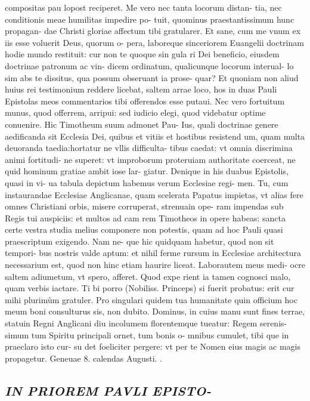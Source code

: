 \documentclass{article}
\begin{document}
\begin{pages}
compositas pau lopost reciperet. Me vero nec tanta locorum distan- tia, nec conditionis meae humilitas impedire po- tuit, quominus praestantissimum hunc propagan- dae Christi gloriae affectum tibi gratularer. Et sane, cum me vnum ex iis esse voluerit Deus, quorum o- pera, laboreque sinceriorem Euangelii doctrinam hodie mundo restituit: cur non te quoque sin gula ri Dei beneficio, eiusdem doctrinae patronum ac vin- dicem ordinatum, qualicunque locorum interual- lo sim abs te dissitus, qua possum obseruant ia prose- quar? Et quoniam non aliud huius rei testimonium reddere licebat, saltem arrae loco, hos in duas Pauli Epistolas meos commentarios tibi offerendos esse putaui. Nec vero fortuitum munus, quod offerrem, arripui: sed iudicio elegi, quod videbatur optime conuenire. Hic Timotheum suum admonet Pau- Ius, quali doctrinae genere aedificanda sit Ecclesia Dei, quibus et vitiis et hostibus resistend um, quam multa deuoranda taedia:hortatur ne vllis difficulta- tibus caedat: vt omnia discrimina animi fortitudi- ne superet: vt improborum proteruiam authoritate coerceat, ne quid hominum gratiae ambit iose lar- giatur. Denique in his duabus Epistolis, quasi in vi- ua tabula depictum habemus verum Ecclesiae regi-  \pend\pstart men. Tu, cum instaurandae Ecclesiae Anglicanae, quam scelerata Papatus impietas, vt alias fere omnes Christiani orbis, misere corruperat, strenuain ope- ram impendas sub Regis tui auspiciis: et multos ad cam rem Timotheos in opere habeas: sancta certe vestra studia melius componere non potestis, quam ad hoc Pauli quasi praescriptum exigendo. Nam ne- que hic quidquam habetur, quod non sit tempori- bus nostris valde aptum: et nihil ferme rursum in Ecclesiae architectura necessarium est, quod non hinc etiam haurire liceat. Laborautem meus medi- ocre saltem adiumetum, vt spero, afferet. Quod expe rient ia tamen cognosci malo, quam verbis iactare. Ti bi porro (Nobiliss. Princeps) si fuerit probatus: erit cur mihi plurimùm gratuler. Pro singulari quidem tua humanitate quin officium hoc meum boni consulturus sis, non dubito. Dominus, in cuius manu sunt fines terrae, statuin Regni Anglicani diu incolumem florentemque tueatur: Regem serenis- simum tum Spiritu principali ornet, tum bonis o- mnibus cumulet, tibi que in praeclaro isto cur- su det foeliciter pergere: vt per te Nomen eius magis ac magis propagetur.  \pend\pstart Geneuae 8. calendas Augusti.  \pend{}.  \pend
{}
{}
\subsection*{\textit{IN PRIOREM PAVLI EPISTO- }}
{}

\end{pages}
\end{document}

